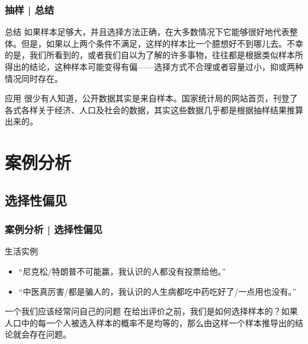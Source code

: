 \begin{frame}
  \frametitle{抽样 | 总结}
  \begin{block}{总结}
如果样本足够大，并且选择方法正确，在大多数情况下它能够很好地代表整体。但是，如果以上两个条件不满足，这样的样本比一个臆想好不到哪儿去。不幸的是，我们所看到的，或者我们自以为了解的许多事物，往往都是根据类似样本所得出的结论，这种样本可能变得有偏——选择方式不合理或者容量过小，抑或两种情况同时存在。
  \end{block}
  \pause
  \begin{block}{应用}
很少有人知道，公开数据其实是来自样本。国家统计局的网站首页，刊登了各式各样关于经济、人口及社会的数据，其实这些数据几乎都是根据抽样结果推算出来的。
  \end{block}
\end{frame}

\section{案例分析}
\subsection{选择性偏见}
\begin{frame}
  \frametitle{案例分析 | 选择性偏见}
  \begin{block}{生活实例}
    \begin{itemize}
      \item “尼克松/特朗普不可能赢，我认识的人都没有投票给他。”
      \item “中医真厉害/都是骗人的，我认识的人生病都吃中药吃好了/一点用也没有。”
    \end{itemize}
  \end{block}
  \pause
  \begin{block}{一个我们应该经常问自己的问题}
    在给出评价之前，我们是如何选择样本的？如果人口中的每一个人被选入样本的概率不是均等的，那么由这样一个样本推导出的结论就会存在问题。
  \end{block}
\end{frame}

